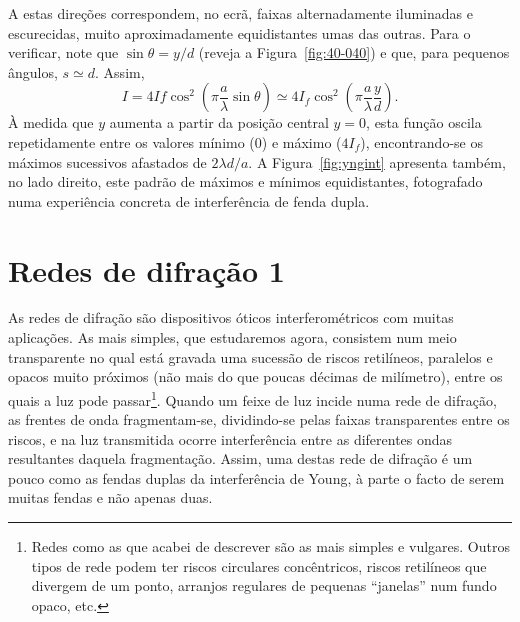A estas direções
correspondem, no ecrã, faixas alternadamente iluminadas e escurecidas,
muito aproximadamente equidistantes umas das outras. Para o verificar, note que
$\sin\theta=y/d$ (reveja a Figura~\ref{fig:40-040}) e que, para pequenos
ângulos, $s\simeq d$. Assim,
\begin{equation*}
  I=4If\cos^2\left(\pi\frac{a}{\lambda}\sin\theta\right)\simeq
  4I_f\cos^2\left(\pi\frac{a}{\lambda}\frac{y}{d}\right).
\end{equation*}
À medida que $y$ aumenta a partir da posição central $y=0$, esta função oscila
repetidamente entre os valores mínimo (0) e máximo ($4I_f$), encontrando-se os
máximos sucessivos afastados de $2\lambda d/a$.  A Figura~\ref{fig:yngint}
apresenta também, no lado direito, este padrão de máximos e mínimos
equidistantes, fotografado numa experiência concreta de interferência de fenda
dupla.

\section{Redes de difração 1} 
As redes de difração são dispositivos óticos interferométricos com muitas
aplicações. As mais simples, que estudaremos agora, consistem num meio
transparente no qual está gravada uma sucessão de riscos retilíneos, paralelos
e opacos muito próximos (não mais do que poucas décimas de milímetro), entre os
quais a luz pode passar\footnote{Redes como as que acabei de descrever são as
  mais simples e vulgares. Outros tipos de rede podem ter riscos circulares
  concêntricos, riscos retilíneos que divergem de um ponto, arranjos regulares
  de pequenas ``janelas'' num fundo opaco, etc.}. Quando um feixe de luz incide
numa rede de difração, as frentes de onda fragmentam-se, dividindo-se pelas
faixas transparentes entre os riscos, e na luz transmitida ocorre interferência
entre as diferentes ondas resultantes daquela fragmentação.  Assim, uma destas
rede de difração é um pouco como as fendas duplas da interferência de Young, à
parte o facto de serem muitas fendas e não apenas duas. 

